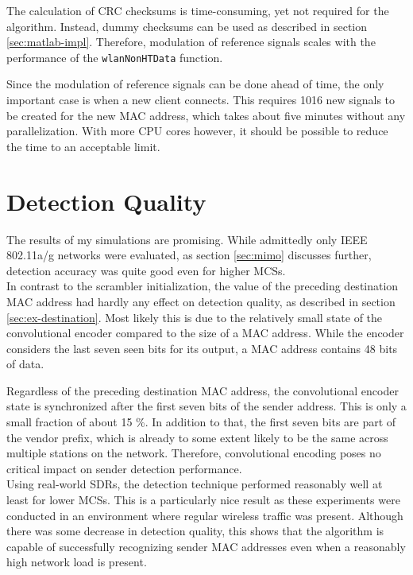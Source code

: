 The calculation of \gls{CRC} checksums is time-consuming, yet not required for the algorithm. Instead, dummy checksums can be used as described in section \ref{sec:matlab-impl}. Therefore, modulation of reference signals scales with the performance of the \texttt{wlanNonHTData} function.

Since the modulation of reference signals can be done ahead of time, the only important case is when a new client connects. This requires 1016 new signals to be created for the new \gls{MAC} address, which takes about five minutes without any parallelization. With more CPU cores however, it should be possible to reduce the time to an acceptable limit.



\section{Detection Quality}\label{sec:detection-quality}

The results of my simulations are promising. While admittedly only IEEE 802.11a/g networks were evaluated, as section \ref{sec:mimo} discusses further, detection accuracy was quite good even for higher \glspl{MCS}.\\

In contrast to the scrambler initialization, the value of the preceding destination \gls{MAC} address had hardly any effect on detection quality, as described in section \ref{sec:ex-destination}. Most likely this is due to the relatively small state of the convolutional encoder compared to the size of a \gls{MAC} address. While the encoder considers the last seven seen bits for its output, a \gls{MAC} address contains 48 bits of data.

Regardless of the preceding destination \gls{MAC} address, the convolutional encoder state is synchronized after the first seven bits of the sender address. This is only a small fraction of about 15 \%. In addition to that, the first seven bits are part of the vendor prefix, which is already to some extent likely to be the same across multiple stations on the network. Therefore, convolutional encoding poses no critical impact on sender detection performance.\\

Using real-world \glspl{SDR}, the detection technique performed reasonably well at least for lower \glspl{MCS}. This is a particularly nice result as these experiments were conducted in an environment where regular wireless traffic was present. Although there was some decrease in detection quality, this shows that the algorithm is capable of successfully recognizing sender \gls{MAC} addresses even when a reasonably high network load is present.


